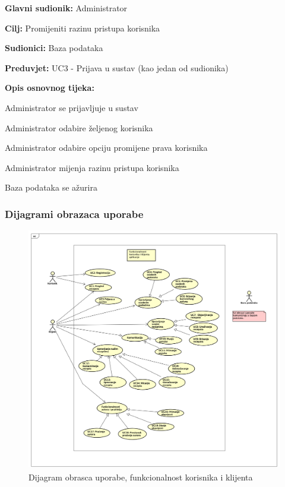 					\noindent {}
					\begin{packed_item}
	
						\item \textbf{Glavni sudionik: } Administrator
						\item  \textbf{Cilj:} Promijeniti razinu pristupa korisnika
						\item  \textbf{Sudionici:} Baza podataka
						\item  \textbf{Preduvjet:} UC3 - Prijava u sustav (kao jedan od sudionika)
						\item  \textbf{Opis osnovnog tijeka:}
						
						\item[] \begin{packed_enum}
							
							\item Administrator se prijavljuje u sustav
							\item Administrator odabire željenog korisnika
							\item Administrator odabire opciju promijene prava korisnika
							\item Administrator mijenja razinu pristupa korisnika
							\item Baza podataka se ažurira
						\end{packed_enum}
					\end{packed_item}
				
					
			\subsubsection{Dijagrami obrazaca uporabe}
				\begin{figure}[H]
					\includegraphics[scale=0.6]{dijagrami/Korisnik_klijent.png} 
					\centering
					\caption{Dijagram obrasca uporabe, funkcionalnost korisnika i klijenta}
					\label{fig:korisnik-klijent}
				\end{figure}
				\eject


